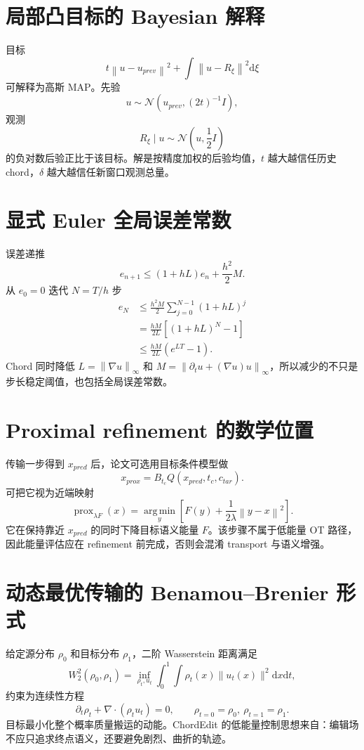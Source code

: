 \documentclass[UTF8,12pt,a4paper,fontset=none]{ctexart}
\numberwithin{equation}{section}
\newcommand{\norm}[1]{\left\lVert #1\right\rVert}
\newcommand{\argmin}{\operatorname*{arg\,min}}
\newcommand{\dd}{\mathrm{d}}
\begin{document}
\section{局部凸目标的 Bayesian 解释}
目标
\begin{equation}
 t\norm{u-u_{prev}}^2+\int\norm{u-R_\xi}^2\dd\xi
\end{equation}
可解释为高斯 MAP。先验
\begin{equation}
 u\sim\mathcal N(u_{prev},(2t)^{-1}I),
\end{equation}
观测
\begin{equation}
 R_\xi\mid u\sim\mathcal N(u,\frac12I)
\end{equation}
的负对数后验正比于该目标。解是按精度加权的后验均值，$t$ 越大越信任历史 chord，$\delta$ 越大越信任新窗口观测总量。

\section{显式 Euler 全局误差常数}
误差递推
\begin{equation}
 e_{n+1}\le(1+hL)e_n+\frac{h^2}{2}M.
\end{equation}
从 $e_0=0$ 迭代 $N=T/h$ 步
\begin{align}
 e_N
 &\le\frac{h^2M}{2}\sum_{j=0}^{N-1}(1+hL)^j\\
 &=\frac{hM}{2L}[(1+hL)^N-1]\\
 &\le\frac{hM}{2L}(e^{LT}-1).
\end{align}
Chord 同时降低 $L=\norm{\nabla u}_\infty$ 和 $M=\norm{\partial_tu+(\nabla u)u}_\infty$，所以减少的不只是步长稳定阈值，也包括全局误差常数。

\section{Proximal refinement 的数学位置}
传输一步得到 $x_{pred}$ 后，论文可选用目标条件模型做
\begin{equation}
 x_{prox}=B_{t_c}Q(x_{pred},t_c,c_{tar}).
\end{equation}
可把它视为近端映射
\begin{equation}
 \operatorname{prox}_{\lambda F}(x)
 =\argmin_y\left[F(y)+\frac1{2\lambda}\norm{y-x}^2\right].
\end{equation}
它在保持靠近 $x_{pred}$ 的同时下降目标语义能量 $F$。该步骤不属于低能量 OT 路径，因此能量评估应在 refinement 前完成，否则会混淆 transport 与语义增强。
\clearpage
\section{动态最优传输的 Benamou--Brenier 形式}
给定源分布 $\rho_0$ 和目标分布 $\rho_1$，二阶 Wasserstein 距离满足
\begin{equation}
 W_2^2(\rho_0,\rho_1)=
 \inf_{\rho_t,u_t}
 \int_0^1\int\rho_t(x)\|u_t(x)\|^2\dd x\dd t,
\end{equation}
约束为连续性方程
\begin{equation}
 \partial_t\rho_t+\nabla\cdot(\rho_tu_t)=0,
 \qquad \rho_{t=0}=\rho_0,\ \rho_{t=1}=\rho_1.
\end{equation}
目标最小化整个概率质量搬运的动能。ChordEdit 的低能量控制思想来自：编辑场不应只追求终点语义，还要避免剧烈、曲折的轨迹。
\end{document}
